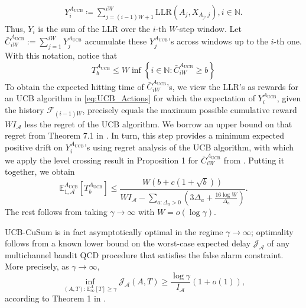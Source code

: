 \documentclass[letterpaper, 10 pt, conference]{ieeeconf}  %
\newcommand{\lp}{\left(}
\newcommand{\rp}{\right)}
\newcommand{\lb}{\left[}
\newcommand{\rb}{\right]}
\newcommand{\lbp}{\left\{}
\newcommand{\rbp}{\right\}}
\newcommand{\mcal}{\mathcal}
\newcommand{\mrm}{\mathrm}
\newcommand{\mbb}{\mathbb}
\newcommand{\E}{\mathbb{E}}
\begin{document}
%
\begin{gather}\label{eq:Sum_LLR}
    Y_{i}^{A_{\mrm{UCB}}} \coloneqq \sum_{j=(i-1)W + 1}^{iW} \mrm{LLR}\lp A_{j}, X_{A_{j}, j}\rp, i \in \mbb{N}.
\end{gather}
%
Thus, $Y_i$ is the sum of the LLR over the $i$-th $W$-step window. Let $\bar{C}_{iW}^{A_{\mrm{UCB}}} := \sum_{j=1}^{iW} Y_{j}^{A_{\mrm{UCB}}}$ accumulate these $Y_{j}^{A_{\mrm{UCB}}}$'s across windows up to the $i$-th one. With this notation, notice that 
%
\begin{equation}
    T_{b}^{A_{\mrm{UCB}}} \leq W \inf \lbp i \in \mbb{N}: \bar{C}_{iW}^{A_{\mrm{UCB}}} \geq b \rbp
\end{equation}
%
To obtain the expected hitting time of $\bar{C}^{A_{\mrm{UCB}}}_{iW}$'s, we view the LLR's as rewards for an UCB algorithm in \eqref{eq:UCB_Actions} for which the expectation of $Y_i^{A_{\mrm{UCB}}}$, given the history $\mcal{F}_{(i-1)W}$, precisely equals the maximum possible cumulative reward $WI_{\mcal{A}}$ less the regret of the UCB algorithm. We borrow an upper bound on that regret from Theorem 7.1 in  \cite{lattimore2020bandit}. In turn, this step provides a minimum expected positive drift on $Y_{i}^{A_{\mrm{UCB}}}$'s using regret analysis of the UCB algorithm, with which we apply the level crossing result in Proposition 1 for $\bar{C}^{A_{\mrm{UCB}}}_{iW}$ from \cite{veeravalli2024quickest}. Putting it together, we obtain
%
\begin{equation}
    \!\!\E_{1,\mcal{A}}^{A_{\mrm{UCB}}} \!\!\lb T_{b}^{A_{\mrm{UCB}}} \rb \!\leq\! \frac{W \lp b + c \lp 1 + \sqrt{b} \rp \rp}{WI_{\mcal{A}} -  \sum_{a: \Delta_{a} > 0} \lp 3\Delta_{a} + \frac{16 \log W}{\Delta_{a}} \rp}.\nonumber
\end{equation}
%
The rest follows from taking $\gamma \to \infty$ with $W = o(\log \gamma)$.

UCB-CuSum is in fact asymptotically optimal in the regime $\gamma \to \infty$; optimality follows from a known lower bound on the worst-case expected delay $\mcal{J}_{\mcal{A}}$ of any multichannel bandit QCD procedure that satisfies the false alarm constraint. More precisely, as $\gamma \to \infty$,
\begin{equation} \label{eq:WADD_low}
\inf_{\lp A, T \rp: \E_{\infty}^{A} \lb T \rb \geq \gamma} \mcal{J}_{\mcal{A}} \lp A, T \rp \geq \frac{\log \gamma}{I_{\mcal{A}}} \lp 1 + o \lp 1 \rp \rp,
\end{equation}
according to Theorem 1 in \cite{veeravalli2024quickest}.
\end{document}
